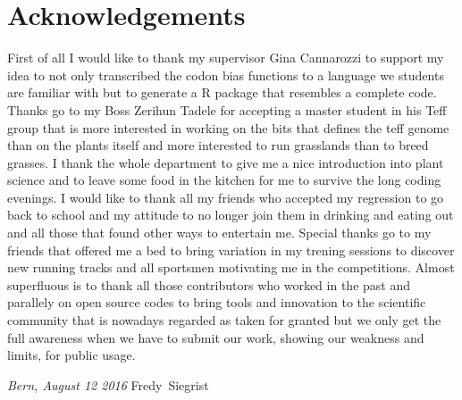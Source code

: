 \chapter*{Acknowledgements}
First of all I would like to thank my supervisor Gina Cannarozzi to support my idea to not only transcribed the codon bias functions to a language we students are familiar with but to generate a R package that resembles a complete code. Thanks go to my Boss Zerihun Tadele for accepting a master student in his Teff group that is more interested in working on the bits that defines the teff genome than on the plants itself and more interested to run grasslands than to breed grasses. I thank the whole department to give me a nice introduction into plant science and to leave some food in the kitchen for me to survive the long coding evenings. I would like to thank all my friends who accepted my regression to go back to school and my attitude to no longer join them in drinking and eating out and all those that found other ways to entertain me. Special thanks go to my friends that offered me a bed to bring variation in my trening sessions to discover new running tracks and all sportsmen motivating me in the competitions. Almost superfluous is to thank all those contributors who worked in the past and parallely on open source codes to bring tools and innovation to the scientific community that is nowadays regarded as taken for granted but we only get the full awareness when we have to submit our work, showing our weakness and limits, for public usage.
\bigskip
 
\noindent\textit{Bern, August 12 2016}
\hfill Fredy~Siegrist

